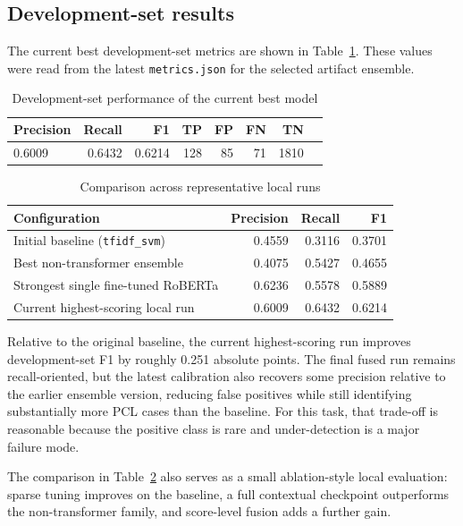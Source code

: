 \documentclass[11pt]{article}
\begin{document}
    \subsection{Development-set results}
    The current best development-set metrics are shown in
    Table~\ref{tab:dev-results}. These values were read from the latest
    \texttt{metrics.json} for the selected artifact ensemble.

    \begin{table}[H]
    \centering
    \caption{Development-set performance of the current best model}
    \label{tab:dev-results}
    \begin{tabular}{lrrrrrrr}
    \toprule
    Precision & Recall & F1 & TP & FP & FN & TN \\
    \midrule
    0.6009 & 0.6432 & 0.6214 & 128 & 85 & 71 & 1810 \\
    \bottomrule
    \end{tabular}
    \end{table}

    \begin{table}[H]
    \centering
    \caption{Comparison across representative local runs}
    \label{tab:experiment-comparison}
    \begin{tabular}{lrrr}
    \toprule
    Configuration & Precision & Recall & F1 \\
    \midrule
    Initial baseline (\texttt{tfidf\_svm}) & 0.4559 & 0.3116 & 0.3701 \\
    Best non-transformer ensemble & 0.4075 & 0.5427 & 0.4655 \\
    Strongest single fine-tuned RoBERTa & 0.6236 & 0.5578 & 0.5889 \\
    Current highest-scoring local run & 0.6009 & 0.6432 & 0.6214 \\
    \bottomrule
    \end{tabular}
    \end{table}

    Relative to the original baseline, the current highest-scoring run improves
    development-set F1 by roughly 0.251 absolute points. The final fused run
    remains recall-oriented, but the latest calibration also recovers some
    precision relative to the earlier ensemble version, reducing false
    positives while still identifying substantially more PCL cases than the
    baseline. For this task, that trade-off is reasonable because the positive
    class is rare and under-detection is a major failure mode.

The comparison in Table~\ref{tab:experiment-comparison} also serves as a small
ablation-style local evaluation: sparse tuning improves on the baseline, a full
contextual checkpoint outperforms the non-transformer family, and score-level
fusion adds a further gain.
\end{document}
